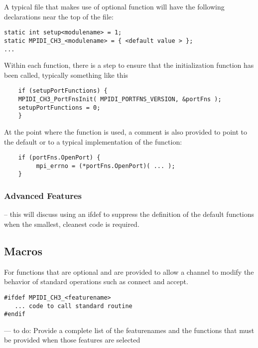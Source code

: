 \documentclass{report}
\begin{document}
A typical file that makes use of optional function will have the
following declarations near the top of the file:
\begin{verbatim}
static int setup<modulename> = 1;
static MPIDI_CH3_<modulename> = { <default value > };
...

\end{verbatim}

Within each function, there is a step to ensure that the
initialization function has been called, typically something like this
\begin{verbatim}
    if (setupPortFunctions) {
	MPIDI_CH3_PortFnsInit( MPIDI_PORTFNS_VERSION, &portFns );
	setupPortFunctions = 0;
    }
\end{verbatim}

At the point where the function is used, a comment is also provided to
point to the default or to a typical implementation of the function:
\begin{verbatim}
    if (portFns.OpenPort) {
         mpi_errno = (*portFns.OpenPort)( ... );
    }
\end{verbatim}

\subsubsection{Advanced Features}
-- this will discuss using an ifdef to suppress the definition of the
   default functions when the smallest, cleanest code is required.

\subsection{Macros}

For functions that are optional and are provided to allow a channel to 
modify the behavior of standard operations such as connect and accept.
\begin{verbatim}
#ifdef MPIDI_CH3_<featurename>
   ... code to call standard routine
#endif
\end{verbatim}

--- to do: Provide a complete list of the featurenames and the
    functions that must be provided when those features are selected
\end{document}
